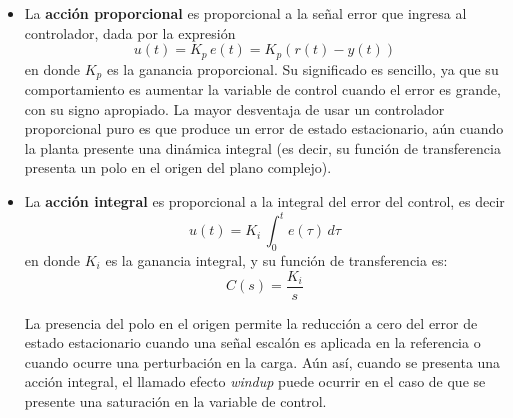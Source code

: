 \begin{itemize}
  \item La \textbf{acción proporcional} es proporcional a la señal error que ingresa al controlador, dada por la expresión
  \begin{equation*}
    u(t) = K_p \, e(t) = K_p \left( r(t) - y(t) \right)
  \end{equation*}
  en donde $K_p$ es la ganancia proporcional. Su significado es sencillo, ya que su comportamiento es aumentar la variable de control cuando el error es grande, con su signo apropiado. La mayor desventaja de usar un controlador proporcional puro es que produce un error de estado estacionario, aún cuando la planta presente una dinámica integral (es decir, su función de transferencia presenta un polo en el origen del plano complejo).
  \item La \textbf{acción integral} es proporcional a la integral del error del control, es decir
  \begin{equation*}
    u(t) = K_i \, \int_{0}^{t} e(\tau) \, d\tau
  \end{equation*}
  en donde $K_i$ es la ganancia integral, y su función de transferencia es:
  \begin{equation*}
    C(s) = \frac{K_i}{s}
  \end{equation*}

  La presencia del polo en el origen permite la reducción a cero del error de estado estacionario cuando una señal escalón es aplicada en la referencia o cuando ocurre una perturbación en la carga. Aún así, cuando se presenta una acción integral, el llamado efecto \emph{windup} puede ocurrir en el caso de que se presente una saturación en la variable de control.


\end{itemize}
